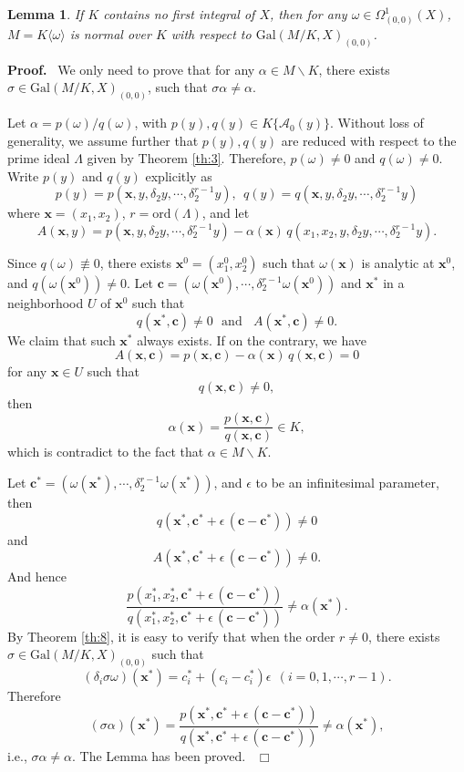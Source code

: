 \documentclass[preprint, 12pt]{elsarticle}
\newtheorem{lem}[thm]{Lemma}
\numberwithin{equation}{section}
\newenvironment{proof}[1][Proof]{\textbf{#1.}\ }{\ $\Box$}
\newcommand{\A}{\mathcal{A}}
\newcommand{\Gal}{\mathrm{Gal}}
\begin{document}
\begin{lem}
\label{le:22} If $K$ contains no first integral of $X$, then for
any $\omega\in \Omega_{(0,0)}^1(X)$, $M = K\langle \omega\rangle $
is normal over $K$ with respect to $\Gal(M/K,X)_{(0,0)}$.
\end{lem}
\begin{proof}
We only need to prove that for any $\alpha\in M\backslash K$,
there exists $\sigma\in \Gal(M/K,X)_{(0,0)}$, such that
$\sigma\alpha\not=\alpha$.

Let $\alpha = p(\omega)/q(\omega)$, with $p(y), q(y)\in
K\{\A_0(y)\}$. Without loss of generality, we assume further that
$p(y), q(y)$ are reduced with respect to the prime ideal $\Lambda$ given by Theorem \ref{th:3}.
Therefore, $p(\omega)\not=0$ and $q(\omega)\not=0$. Write $p(y)$ and
$q(y)$ explicitly as
$$p(y) = p(\mathbf{x},y,\delta_2y,\cdots,\delta_2^{r-1}y),\ \ q(y) = q(\mathbf{x},y,\delta_2y,\cdots,\delta_2^{r-1}y)$$
where $\mathbf{x} = (x_1, x_2)$, $r = \mathrm{ord}(\Lambda)$, and let
$$A(\mathbf{x},y) = p(\mathbf{x},y,\delta_2y,\cdots,\delta_2^{r-1}y) -
\alpha(\mathbf{x})\,q(x_1,x_2,y,\delta_2y,\cdots,\delta_2^{r-1}y).
$$

Since $q(\omega)\not\equiv0$, there exists
$\mathbf{x}^0 = (x_1^0, x_2^0)$ such that $\omega(\mathbf{x})$ is
analytic at $\mathbf{x}^0$, and $q(\omega(\mathbf{x}^0))\not=0$.
Let $\mathbf{c} =
(\omega(\mathbf{x}^0),\cdots,\delta_2^{r-1}\omega(\mathbf{x}^0))$
and $\mathbf{x}^*$ in a neighborhood $U$ of
$\mathbf{x}^0$ such that
$$q(\mathbf{x}^*, \mathbf{c})\not=0\ \ \ \mathrm{and}\ \ \ \ A(\mathbf{x}^*, \mathbf{c})\not=0.$$
We claim that such $\mathbf{x}^*$ always exists. If on the
contrary, we have
$$A(\mathbf{x},\mathbf{c}) = p(\mathbf{x},\mathbf{c}) - \alpha(\mathbf{x})\,q(\mathbf{x},\mathbf{c}) = 0$$
for any $\mathbf{x}\in U$ such that
$$q(\mathbf{x}, \mathbf{c})\not=0,$$
then
$$\alpha(\mathbf{x}) = \frac{p(\mathbf{x},\mathbf{c})}{q(\mathbf{x},\mathbf{c})}\in K,$$
which is contradict to the fact that $\alpha\in M\backslash K$.

Let $\mathbf{c^*} =
(\omega(\mathbf{x}^*),\cdots,\delta_2^{r-1}\omega(\mathrm{x}^*))$,
and $\epsilon$ to be an infinitesimal parameter, then 
$$q(\mathbf{x}^*,\mathbf{c^*}+ \epsilon\,(\mathbf{c} - \mathbf{c^*}))\not=0$$
and
$$A(\mathbf{x}^*,\mathbf{c^*}+ \epsilon\,(\mathbf{c} - \mathbf{c^*}))\not=0.$$
And hence
$$\frac{p(x_1^*,x_2^*,\mathbf{c^*}+ \epsilon\,(\mathbf{c} - \mathbf{c^*}))}
{q(x_1^*,x_2^*,\mathbf{c^*}+ \epsilon\,(\mathbf{c} -
\mathbf{c^*}))}\not=\alpha(\mathbf{x}^*).$$ 
By Theorem \ref{th:8},
it is easy to verify that when the order $r\not=0$, there exists
$\sigma\in\Gal(M/K,X)_{(0,0)}$ such that
$$(\delta_i\sigma\omega)(\mathbf{x}^*) = c_i^* + (c_i-c_i^*)\epsilon\ \ (i = 0,1,\cdots,r-1).$$
Therefore
$$(\sigma\alpha)(\mathbf{x}^*)  = \frac{p(\mathbf{x}^*,\mathbf{c^*}+ \epsilon\,(\mathbf{c} - \mathbf{c^*}))}
{q(\mathbf{x}^*,\mathbf{c^*}+ \epsilon\,(\mathbf{c} -
\mathbf{c^*}))}\not= \alpha(\mathbf{x}^*),$$ 
i.e., $\sigma\alpha\not=\alpha$. The Lemma has been proved.
\end{proof}
\end{document}
